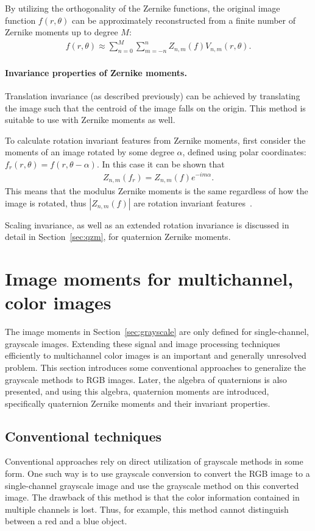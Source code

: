 By utilizing the orthogonality of the Zernike functions, the original image function $f(r,\theta)$ can be approximately reconstructed from a finite number of Zernike moments up to degree $M$:
\begin{gather}\label{eq:reconstruction}
    f(r,\theta) \approx \sum_{n=0}^{M}\sum_{m=-n}^{n}Z_{n,m}(f)V_{n,m}(r,\theta).
\end{gather}

\paragraph{Invariance properties of Zernike moments.} Translation invariance (as described previously) can be achieved by translating the image such that the centroid of the image falls on the origin. This method is suitable to use with Zernike moments as well.


To calculate rotation invariant features from Zernike moments, first consider the moments of an image rotated by some degree $\alpha$, defined using polar coordinates: $f_{r}(r,\theta) = f(r,\theta - \alpha)$. In this case it can be shown that
\begin{gather*}
    Z_{n,m}(f_r) =  Z_{n,m}(f) e^{-i m\alpha}.
\end{gather*}
This means that the modulus Zernike moments is the same regardless of how the image is rotated, thus $|Z_{n,m}(f)|$ are rotation invariant features~\cite{zernike_moments}.


Scaling invariance, as well as an extended rotation invariance is discussed in detail in Section~\ref{sec:qzm}, for quaternion Zernike moments.

\section{Image moments for multichannel, color images}
The image moments in Section~\ref{sec:grayscale} are only defined for single-channel, grayscale images. Extending these signal and image processing techniques efficiently to multichannel color images is an important and generally unresolved problem. This section introduces some conventional approaches to generalize the grayscale methods to RGB images. Later, the algebra of quaternions is also presented, and using this algebra, quaternion moments are introduced, specifically quaternion Zernike moments and their invariant properties.  

\subsection{Conventional techniques}
Conventional approaches rely on direct utilization of grayscale methods in some form. One such way is to use grayscale conversion to convert the RGB image to a single-channel grayscale image and use the grayscale method on this converted image. The drawback of this method is that the color information contained in multiple channels is lost. Thus, for example, this method cannot distinguish between a red and a blue object.

